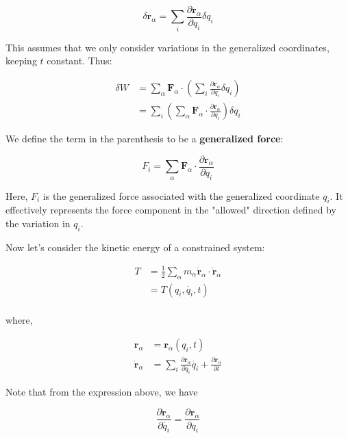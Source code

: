 \begin{equation}
    \delta \mathbf{r}_\alpha = \sum_{i} \frac{\partial \mathbf{r}_\alpha}{\partial q_i} \delta q_i
\end{equation}

This assumes that we only consider variations in the generalized coordinates, keeping 
$t$ constant. Thus:

\begin{align}
    \delta W &= \sum_{\alpha} \mathbf{F}_\alpha \cdot \left(\sum_{i} \frac{\partial \mathbf{r}_\alpha}{\partial q_i} \delta q_i \right) \\
             &= \sum_{i} \left(\sum_{\alpha} \mathbf{F}_{\alpha} \cdot \frac{ \partial \mathbf{r}_\alpha}{\partial q_i} \right) \delta q_i
\end{align}

We define the term in the parenthesis to be a \textbf{generalized force}:

\[
    F_i = \sum_{\alpha} \mathbf{F}_{\alpha} \cdot \frac{\partial \mathbf{r}_\alpha}{\partial q_i}
\]

Here, $F_i$ is the generalized force associated with the generalized coordinate $q_i$. It effectively represents the force component in the "allowed" direction defined by the variation in $q_i$.

Now let's consider the kinetic energy of a constrained system:

\begin{align}
    T &= \frac{1}{2} \sum_{\alpha} m_\alpha \dot{\mathbf{r}}_\alpha \cdot \dot{\mathbf{r}}_\alpha \\
      &= T(q_i, \dot{q_i}, t) \\
\end{align}

where,

\begin{align}
    \mathbf{r}_\alpha &= \mathbf{r}_\alpha(q_i, t) \\
    \dot{\mathbf{r}}_\alpha &= \sum_i \frac{\partial \mathbf{r}_\alpha}{\partial q_i} \dot{q_i} + \frac{\partial \mathbf{r}_\alpha}{\partial t}
\end{align}

Note that from the expression above, we have

\begin{equation}
    \frac{\partial \dot{\mathbf{r}}_\alpha}{\partial \dot{q_i}} = \frac{\partial \mathbf{r}_\alpha}{\partial q_i}
\end{equation}

